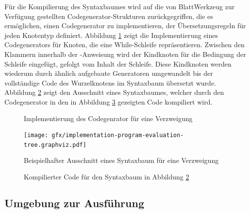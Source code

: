 Für die Kompilierung des Syntaxbaumes wird auf die von BlattWerkzeug zur Verfügung gestellten Codegenerator-Struk\-turen zurückgegriffen, die es ermöglichen, einen Codegenerator zu implementieren, der Übersetzungsregeln für jeden Knotentyp definiert. Abbildung \ref{fig:implementation:evaluation:codegenerator} zeigt die Implementierung eines Codegenerators für Knoten, die eine While-Schleife repräsentieren. Zwischen den Klammern innerhalb der -An\-wei\-sung wird der Kindknoten für die Bedingung der Schleife eingefügt, gefolgt vom Inhalt der Schleife. Diese Kindknoten werden wiederum durch ähnlich aufgebaute Generatoren umgewandelt bis der vollständige Code des Wurzelknotens im Syntaxbaum übersetzt wurde. Abbildung \ref{fig:implementation:evaluation:tree-render} zeigt den Ausschnitt eines Syntaxbaumes, welcher durch den Codegenerator in den in Abbildung \ref{fig:implementation:evaluation:tree-result} gezeigten Code kompiliert wird.

\begin{figure}
  
  \caption{Implementierung des Codegenrator für eine Verzweigung}
  \label{fig:implementation:evaluation:codegenerator}
\end{figure}

\begin{figure}
  \centering
  \texttt{[image: gfx/implementation-program-evaluation-tree.graphviz.pdf]}
  \caption{Beispielhafter Ausschnitt eines Syntaxbaum für eine Verzweigung}
  \label{fig:implementation:evaluation:tree-render}
\end{figure}

\begin{figure}
  
  \caption{Kompilierter Code für den Syntaxbaum in Abbildung \ref{fig:implementation:evaluation:tree-render}}
  \label{fig:implementation:evaluation:tree-result}
\end{figure}

\subsection[Umgebung zur Ausführung]{Umgebung zur Ausführung\protect\footnotemark}
\label{sec:implementation:evaluation:environment}


